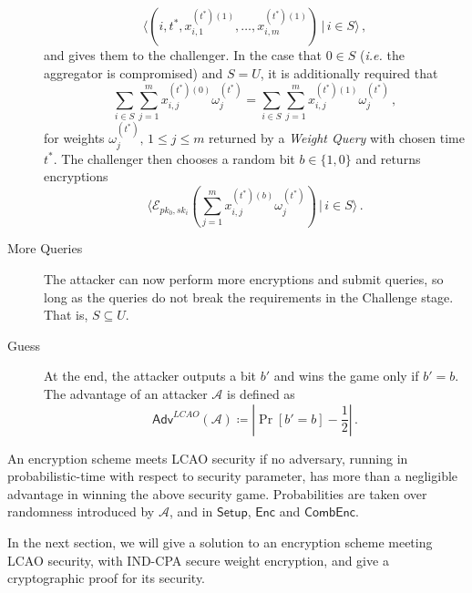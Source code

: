 \documentclass[twocolumn]{autart}
\begin{document}
\begin{description}
\begin{equation*}
        \langle(i,t^*,x^{(t^*)(1)}_{i,1},\dots,x^{(t^*)(1)}_{i,m})\,|\, i \in S\rangle\,,
    \end{equation*}
    and gives them to the challenger. In the case that $0 \in S$ (\textit{i.e.} the aggregator is compromised) and $S = U$, it is additionally required that
    \begin{equation*}
        \sum_{i\in S}\sum^{m}_{j=1} x^{(t^*)(0)}_{i,j}\omega^{(t^*)}_j = \sum_{i \in S}\sum^{m}_{j=1} x^{(t^*)(1)}_{i,j}\omega^{(t^*)}_j\,,
    \end{equation*}
    for weights $\omega^{(t^*)}_j,\,1\leq j \leq m$ returned by a \textit{Weight Query} with chosen time $t^*$. The challenger then chooses a random bit $b \in \{1,0\}$ and returns encryptions 
    \begin{equation*}
        \langle\mathcal{E}_{pk_0,sk_i}(\sum^m_{j=1}x^{(t^*)(b)}_{i,j}\omega^{(t^*)}_j)\,|\,i\in S\rangle\,.
    \end{equation*}
    \item[More Queries] The attacker can now perform more encryptions and submit queries, so long as the queries do not break the requirements in the Challenge stage. That is, $S \subseteq U$.
    \item[Guess] At the end, the attacker outputs a bit $b'$ and wins the game only if $b' = b$. The advantage of an attacker $\mathcal{A}$ is defined as
    \begin{equation*}
        \mathsf{Adv}^{LCAO}(\mathcal{A}) \coloneqq \left\lvert \Pr [b'=b] - \frac{1}{2}\right\rvert\,.
    \end{equation*} 
\end{description}

\begin{defn}
    An encryption scheme meets LCAO security if no adversary, running in probabilistic-time with respect to security parameter, has more than a negligible advantage in winning the above security game. Probabilities are taken over randomness introduced by $\mathcal{A}$, and in $\mathsf{Setup}$, $\mathsf{Enc}$ and $\mathsf{CombEnc}$.
\end{defn}

In the next section, we will give a solution to an encryption scheme meeting LCAO security, with IND-CPA secure weight encryption, and give a cryptographic proof for its security.
\end{document}
